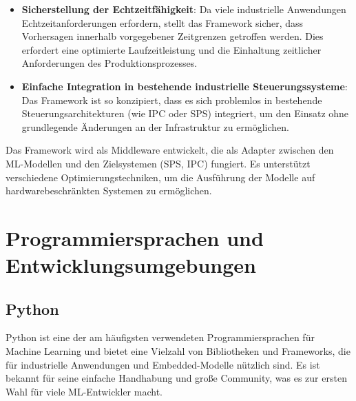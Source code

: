 \begin{itemize}
    \item \textbf{Sicherstellung der Echtzeitfähigkeit}: Da viele industrielle Anwendungen Echtzeitanforderungen erfordern, stellt das Framework sicher, dass 
    Vorhersagen innerhalb vorgegebener Zeitgrenzen getroffen werden. Dies erfordert eine optimierte Laufzeitleistung und die Einhaltung zeitlicher Anforderungen des Produktionsprozesses.
   
    \item \textbf{Einfache Integration in bestehende industrielle Steuerungssysteme}: Das Framework ist so konzipiert, dass es sich problemlos in bestehende Steuerungsarchitekturen 
    (wie IPC oder SPS) integriert, um den Einsatz ohne grundlegende Änderungen an der Infrastruktur zu ermöglichen.
\end{itemize}

Das Framework wird als Middleware entwickelt, die als Adapter zwischen den ML-Modellen und den Zielsystemen (SPS, IPC) fungiert. Es unterstützt verschiedene Optimierungstechniken, 
um die Ausführung der Modelle auf hardwarebeschränkten Systemen zu ermöglichen.

\section{Programmiersprachen und Entwicklungsumgebungen}

\subsection{Python}
Python ist eine der am häufigsten verwendeten Programmiersprachen für Machine Learning und bietet eine Vielzahl von Bibliotheken und Frameworks, 
die für industrielle Anwendungen und Embedded-Modelle nützlich sind. Es ist bekannt für seine einfache Handhabung und große Community, 
was es zur ersten Wahl für viele ML-Entwickler macht.

